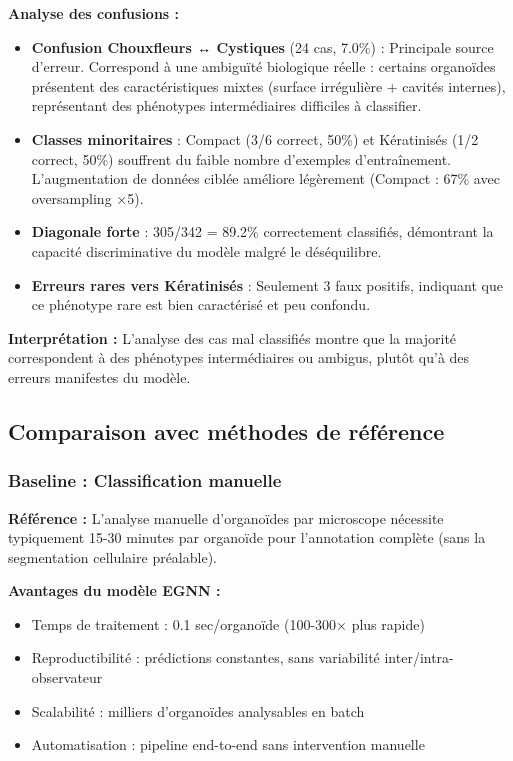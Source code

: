 \textbf{Analyse des confusions :}
\begin{itemize}
    \item \textbf{Confusion Chouxfleurs ↔ Cystiques} (24 cas, 7.0\%) : Principale source d'erreur. Correspond à une ambiguïté biologique réelle : certains organoïdes présentent des caractéristiques mixtes (surface irrégulière + cavités internes), représentant des phénotypes intermédiaires difficiles à classifier.
    
    \item \textbf{Classes minoritaires} : Compact (3/6 correct, 50\%) et Kératinisés (1/2 correct, 50\%) souffrent du faible nombre d'exemples d'entraînement. L'augmentation de données ciblée améliore légèrement (Compact : 67\% avec oversampling ×5).
    
    \item \textbf{Diagonale forte} : 305/342 = 89.2\% correctement classifiés, démontrant la capacité discriminative du modèle malgré le déséquilibre.
    
    \item \textbf{Erreurs rares vers Kératinisés} : Seulement 3 faux positifs, indiquant que ce phénotype rare est bien caractérisé et peu confondu.
\end{itemize}

\textbf{Interprétation :}
L'analyse des cas mal classifiés montre que la majorité correspondent à des phénotypes intermédiaires ou ambigus, plutôt qu'à des erreurs manifestes du modèle.

\subsection{Comparaison avec méthodes de référence}

\subsubsection{Baseline : Classification manuelle}

\textbf{Référence :}
L'analyse manuelle d'organoïdes par microscope nécessite typiquement 15-30 minutes par organoïde pour l'annotation complète (sans la segmentation cellulaire préalable).

\textbf{Avantages du modèle EGNN :}
\begin{itemize}
    \item Temps de traitement : 0.1 sec/organoïde (100-300× plus rapide)
    \item Reproductibilité : prédictions constantes, sans variabilité inter/intra-observateur
    \item Scalabilité : milliers d'organoïdes analysables en batch
    \item Automatisation : pipeline end-to-end sans intervention manuelle
\end{itemize}

